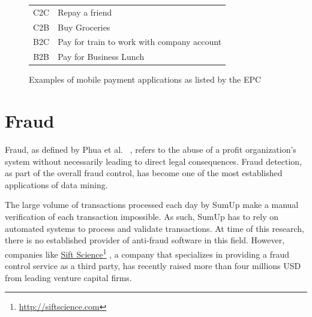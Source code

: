 \documentclass[a4paper, oneside]{csthesis}
\newcommand\fnurl[2]{%
  \href{#2}{#1}\footnote{\url{#2}}%
}
\begin{document}
\begin{figure}
        \centering
        \begin{tabular}{c|l}
        \hline
C2C & Repay a friend \\ \hdashline[0.5pt/3pt]
C2B & Buy Groceries \\ \hdashline[0.5pt/3pt]
B2C & Pay for train to work with company account \\ \hdashline[0.5pt/3pt]
B2B & Pay for Business Lunch \\ \hline
        \end{tabular}
        \caption{Examples of mobile payment applications as listed by the EPC}\label{fig:mp-applications}
\end{figure}




\section{Fraud}

Fraud, as defined by Phua et al. ~\cite{5522816}, refers to the abuse of a profit organization's system without necessarily leading to direct legal consequences. Fraud detection, as part of the overall fraud control, has become one of the most established applications of data mining.

The large volume of transactions processed each day by SumUp make a manual verification of each transaction impossible. As such, SumUp has to rely on automated systems to process and validate transactions. At time of this research, there is no established provider of anti-fraud software in this field. However, companies like \fnurl{Sift Science}{http://siftscience.com}, a company that specializes in providing a fraud control service as a third party, has recently raised more than four millions USD from leading venture capital firms.
\end{document}
